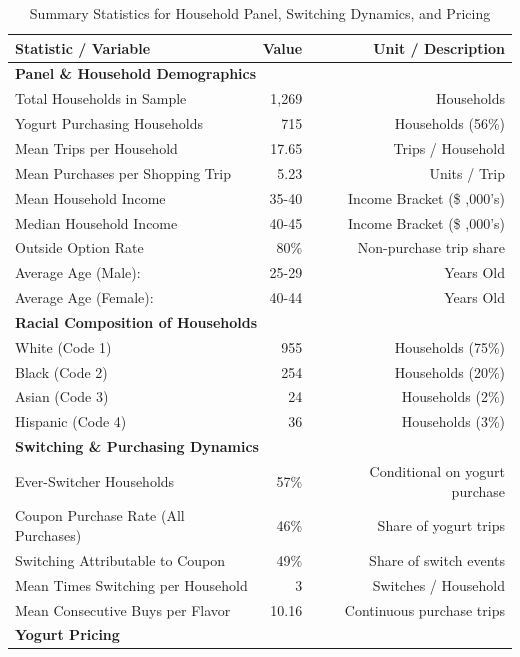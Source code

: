 \documentclass[11pt]{article}
\theoremstyle{definition}
\theoremstyle{remark}
\begin{document}
\begin{table}[htbp]
\centering
\caption{Summary Statistics for Household Panel, Switching Dynamics, and Pricing}
\label{tab:stat_tab}
\begin{tabular}{lrr}
\toprule
\textbf{Statistic / Variable} & \textbf{Value} & \textbf{Unit / Description} \\
\midrule
\multicolumn{3}{l}{\textbf{Panel \& Household Demographics}} \\
\quad Total Households in Sample & 1,269 & Households \\
\quad Yogurt Purchasing Households & 715 & Households (56\%) \\
\quad Mean Trips per Household & 17.65 & Trips / Household \\
\quad Mean Purchases per Shopping Trip & 5.23 & Units / Trip \\
\quad Mean Household Income & 35-40 & Income Bracket (\$ ,000's)\\
\quad Median Household Income & 40-45 & Income Bracket (\$ ,000's) \\
\quad Outside Option Rate & 80\% & Non-purchase trip share \\
\quad Average Age (Male): & 25-29 & Years Old \\
\quad Average Age (Female): & 40-44 & Years Old \\
\midrule
\multicolumn{3}{l}{\textbf{Racial Composition of Households}} \\
\quad White (Code 1) & 955 & Households (75\%) \\
\quad Black (Code 2) & 254 & Households (20\%) \\
\quad Asian (Code 3) & 24 & Households (2\%) \\
\quad Hispanic (Code 4) & 36 & Households (3\%) \\
\midrule
\multicolumn{3}{l}{\textbf{Switching \& Purchasing Dynamics}} \\
\quad Ever-Switcher Households & 57\% & Conditional on yogurt purchase \\
\quad Coupon Purchase Rate (All Purchases) & 46\% & Share of yogurt trips \\
\quad Switching Attributable to Coupon & 49\% & Share of switch events \\
\quad Mean Times Switching per Household & 3 & Switches / Household \\
\quad Mean Consecutive Buys per Flavor & 10.16 & Continuous purchase trips \\
\midrule
\multicolumn{3}{l}{\textbf{Yogurt Pricing}} \\

\end{tabular}
\end{table}
\end{document}

